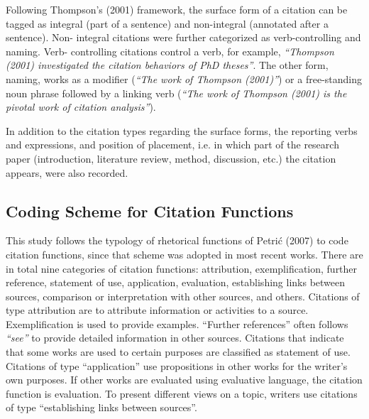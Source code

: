 Following Thompson's (2001) framework, the surface form of a citation can be tagged as integral (part of a sentence) and non-integral (annotated after a sentence). Non- integral citations were further categorized as verb-controlling and naming. Verb- controlling citations control a verb, for example, \textit{“Thompson (2001) investigated the citation behaviors of PhD theses”}. The other form, naming, works as a modifier (\textit{“The work of Thompson (2001)”}) or a free-standing noun phrase followed by a linking verb (\textit{“The work of Thompson (2001) is the pivotal work of citation analysis”}).

In addition to the citation types regarding the surface forms, the reporting verbs and expressions, and position of placement, i.e. in which part of the research paper (introduction, literature review, method, discussion, etc.) the citation appears, were also recorded.

\subsection{Coding Scheme for Citation Functions}
This study follows the typology of rhetorical functions of Petrić (2007) to code citation functions, since that scheme was adopted in most recent works. There are in total nine categories of citation functions: attribution, exemplification, further reference, statement of use, application, evaluation, establishing links between sources, comparison or interpretation with other sources, and others. Citations of type attribution are to attribute information or activities to a source. Exemplification is used to provide examples. “Further references” often follows \textit{“see”} to provide detailed information in other sources. Citations that indicate that some works are used to certain purposes are classified as statement of use. Citations of type “application” use propositions in other works for the writer’s own purposes. If other works are evaluated using evaluative language, the citation function is evaluation. To present different views on a topic, writers use citations of type “establishing links between sources”.